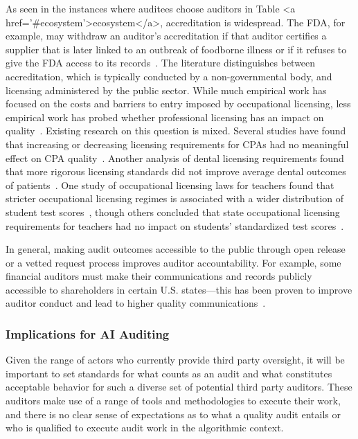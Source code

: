 \documentclass[sigconf]{acmart}
\begin{document}
As seen in the instances where auditees choose auditors in Table <a href='#ecosystem'>ecosystem</a>, accreditation is widespread. The FDA, for example, may withdraw an auditor’s accreditation if that auditor certifies a supplier that is later linked to an outbreak of foodborne illness or if it refuses to give the FDA access to its records~\cite{lytton2014oversight}. The literature distinguishes between accreditation, which is typically conducted by a non-governmental body, and licensing administered by the public sector. While much empirical work has focused on the costs and barriers to entry imposed by occupational licensing, less empirical work has probed whether professional licensing has an impact on quality~\cite{kleiner2000occupational}. Existing research on this question is mixed. Several studies have found that increasing or decreasing licensing requirements for CPAs had no meaningful effect on CPA quality~\cite{barrios2021occupational,cascino2021labor,colbert1999state}. Another analysis of dental licensing requirements found that more rigorous licensing standards did not improve average dental outcomes of patients~\cite{kleiner2000does}. One study of occupational licensing laws for teachers found that stricter occupational licensing regimes is associated with a wider distribution of student test scores~\cite{larsen2013occupational}, though others concluded that state occupational licensing requirements for teachers had no impact on students’ standardized test scores~\cite{goldhaber2000does}.

In general, making audit outcomes accessible to the public through open release or a vetted request process improves auditor accountability. For example, some financial auditors must make their communications and records publicly accessible to shareholders in certain U.S. states—this has been proven to improve auditor conduct and lead to higher quality communications~\cite{turner2010improving}. 

\subsubsection{Implications for AI Auditing}
Given the range of actors who currently provide third party oversight, it will be important to set standards for what counts as an audit and what constitutes acceptable behavior for such a diverse set of potential third party auditors. These auditors make use of a range of tools and methodologies to execute their work, and there is no clear sense of expectations as to what a quality audit entails or who is qualified to execute audit work in the algorithmic context. 
\end{document}
